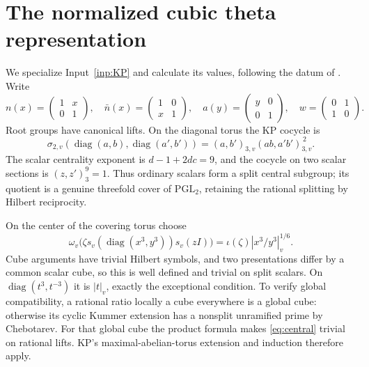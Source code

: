 \documentclass[11pt,a4paper]{article}
\numberwithin{equation}{section}
\theoremstyle{definition}
\theoremstyle{remark}
\begin{document}
\section{The normalized cubic theta representation}\label{sec:theta}
We specialize Input~\ref{inp:KP} and calculate its values, following the datum of \cite[Proposition 5.1 and Appendix A]{PrimitiveRoots}. Write
\[
 n(x)=\begin{pmatrix}1&x\\0&1\end{pmatrix},\quad
 \bar n(x)=\begin{pmatrix}1&0\\x&1\end{pmatrix},\quad
 a(y)=\begin{pmatrix}y&0\\0&1\end{pmatrix},\quad
 w=\begin{pmatrix}0&1\\1&0\end{pmatrix}.
\]
Root groups have canonical lifts. On the diagonal torus the KP cocycle is
\[
 \sigma_{2,v}(\operatorname{diag}(a,b),\operatorname{diag}(a',b'))
 =(a,b')_{3,v}(ab,a'b')_{3,v}^{\,2}.
\]
The scalar centrality exponent is $d-1+2dc=9$, and the cocycle on two scalar sections is $(z,z')_3^9=1$. Thus ordinary scalars form a split central subgroup; its quotient is a genuine threefold cover of $\mathrm{PGL}_2$, retaining the rational splitting by Hilbert reciprocity.

On the center of the covering torus choose
\begin{equation}\label{eq:central}
 \omega_v\bigl(\zeta s_v(\operatorname{diag}(x^3,y^3))s_v(zI)\bigr)
       =\iota(\zeta)|x^3/y^3|_v^{1/6}.
\end{equation}
Cube arguments have trivial Hilbert symbols, and two presentations differ by a common scalar cube, so this is well defined and trivial on split scalars. On $\operatorname{diag}(t^3,t^{-3})$ it is $|t|_v$, exactly the exceptional condition. To verify global compatibility, a rational ratio locally a cube everywhere is a global cube: otherwise its cyclic Kummer extension has a nonsplit unramified prime by Chebotarev. For that global cube the product formula makes \eqref{eq:central} trivial on rational lifts. KP's maximal-abelian-torus extension and induction therefore apply.
\end{document}
